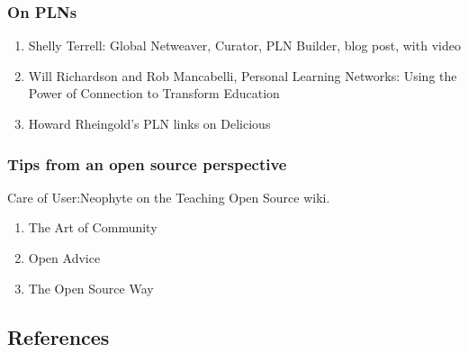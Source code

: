 \subsubsection{On PLNs}

\begin{enumerate}
\item
  Shelly Terrell: Global Netweaver, Curator, PLN Builder, blog post,
  with video
\item
  Will Richardson and Rob Mancabelli, Personal Learning Networks: Using
  the Power of Connection to Transform Education
\item
  Howard Rheingold's PLN links on Delicious
\end{enumerate}
\subsubsection{Tips from an open source perspective}

Care of User:Neophyte on the Teaching Open Source wiki.

\begin{enumerate}
\item
  The Art of Community
\item
  Open Advice
\item
  The Open Source Way
\end{enumerate}
\subsection{References}

